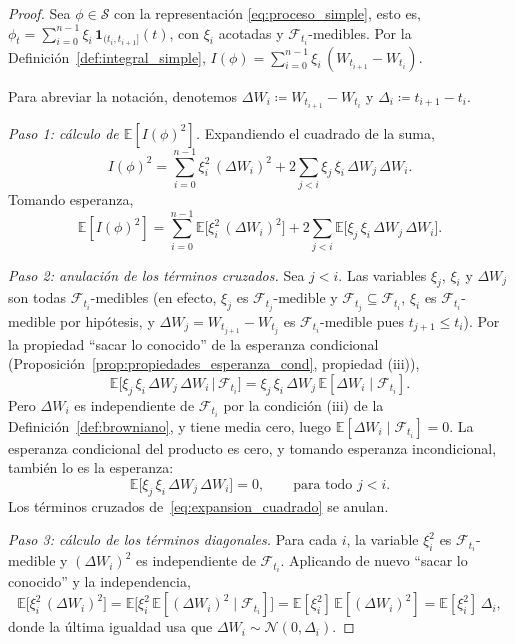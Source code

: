 \documentclass[11pt,a4paper,oneside]{report}
\theoremstyle{plain}
\theoremstyle{definition}
\theoremstyle{remark}
\newcommand{\E}{\mathbb{E}}
\newcommand{\F}{\mathcal{F}}
\newcommand{\1}{\mathbf{1}}
\newcommand{\eqdef}{\coloneqq}
\begin{document}
\begin{proof}
Sea $\phi \in \mathcal{S}$ con la representación
\eqref{eq:proceso_simple}, esto es, $\phi_t = \sum_{i=0}^{n-1} \xi_i\,
\mathbf{1}_{(t_i, t_{i+1}]}(t)$, con $\xi_i$ acotadas y
$\F_{t_i}$-medibles. Por la
Definición~\ref{def:integral_simple}, $I(\phi) = \sum_{i=0}^{n-1}
\xi_i\, (W_{t_{i+1}} - W_{t_i})$.

Para abreviar la notación, denotemos $\Delta W_i \eqdef W_{t_{i+1}} -
W_{t_i}$ y $\Delta_i \eqdef t_{i+1} - t_i$.

\emph{Paso 1: cálculo de $\E[I(\phi)^2]$.} Expandiendo el cuadrado de
la suma,
\begin{equation*}
  I(\phi)^2 = \sum_{i=0}^{n-1} \xi_i^2\, (\Delta W_i)^2
            + 2 \sum_{j < i} \xi_j\, \xi_i\, \Delta W_j\, \Delta W_i.
\end{equation*}
Tomando esperanza,
\begin{equation}\label{eq:expansion_cuadrado}
  \E[I(\phi)^2]
  = \sum_{i=0}^{n-1} \E\bigl[\xi_i^2\, (\Delta W_i)^2\bigr]
  + 2 \sum_{j < i} \E\bigl[\xi_j\, \xi_i\, \Delta W_j\, \Delta W_i\bigr].
\end{equation}

\emph{Paso 2: anulación de los términos cruzados.} Sea $j < i$. Las
variables $\xi_j$, $\xi_i$ y $\Delta W_j$ son todas
$\F_{t_i}$-medibles (en efecto, $\xi_j$ es $\F_{t_j}$-medible y
$\F_{t_j} \subseteq \F_{t_i}$, $\xi_i$ es $\F_{t_i}$-medible por
hipótesis, y $\Delta W_j = W_{t_{j+1}} - W_{t_j}$ es $\F_{t_i}$-medible
pues $t_{j+1} \leq t_i$). Por la propiedad ``sacar lo conocido'' de la
esperanza condicional (Proposición~\ref{prop:propiedades_esperanza_cond},
propiedad (iii)),
\begin{equation*}
  \E\bigl[\xi_j\, \xi_i\, \Delta W_j\, \Delta W_i \,\big|\, \F_{t_i}\bigr]
  = \xi_j\, \xi_i\, \Delta W_j\, \E[\Delta W_i \mid \F_{t_i}].
\end{equation*}
Pero $\Delta W_i$ es independiente de $\F_{t_i}$ por la condición (iii)
de la Definición~\ref{def:browniano}, y tiene media cero, luego
$\E[\Delta W_i \mid \F_{t_i}] = 0$. La esperanza condicional del
producto es cero, y tomando esperanza incondicional, también lo es la
esperanza:
\begin{equation*}
  \E\bigl[\xi_j\, \xi_i\, \Delta W_j\, \Delta W_i\bigr] = 0,
  \qquad \text{para todo } j < i.
\end{equation*}
Los términos cruzados de~\eqref{eq:expansion_cuadrado} se anulan.

\emph{Paso 3: cálculo de los términos diagonales.} Para cada $i$, la
variable $\xi_i^2$ es $\F_{t_i}$-medible y $(\Delta W_i)^2$ es
independiente de $\F_{t_i}$. Aplicando de nuevo ``sacar lo conocido'' y
la independencia,
\begin{equation*}
  \E\bigl[\xi_i^2\, (\Delta W_i)^2\bigr]
  = \E\bigl[\xi_i^2\, \E[(\Delta W_i)^2 \mid \F_{t_i}]\bigr]
  = \E[\xi_i^2]\, \E[(\Delta W_i)^2]
  = \E[\xi_i^2]\, \Delta_i,
\end{equation*}
donde la última igualdad usa que $\Delta W_i \sim \mathcal{N}(0,
\Delta_i)$.


\end{proof}
\end{document}
